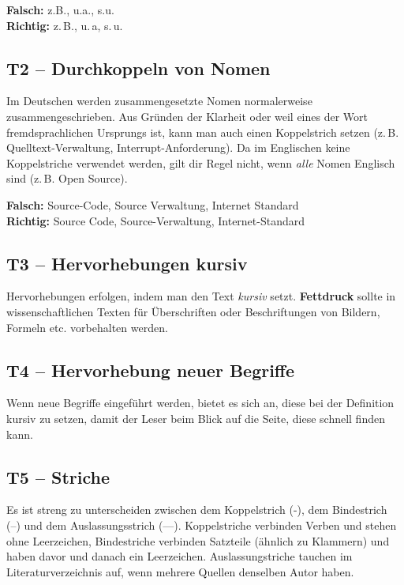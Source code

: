 \documentclass[a4paper,11pt,headings=normal]{scrartcl}
\begin{document}
\textbf{Falsch:} z.B., u.a., s.u. \\
\textbf{Richtig:} z.\,B., u.\,a, s.\,u.


\subsection*{T2 -- Durchkoppeln von Nomen}

Im Deutschen werden zusammengesetzte Nomen normalerweise zusammengeschrieben. Aus Gründen der Klarheit oder weil eines der Wort fremdsprachlichen Ursprungs ist, kann man auch einen Koppelstrich setzen (z.\,B. Quelltext-Verwaltung, Interrupt-Anforderung). Da im Englischen keine Koppelstriche verwendet werden, gilt dir Regel nicht, wenn \textit{alle} Nomen Englisch sind (z.\,B. Open Source).

\textbf{Falsch:} Source-Code, Source Verwaltung, Internet Standard \\
\textbf{Richtig:} Source Code, Source-Verwaltung, Internet-Standard


\subsection*{T3 -- Hervorhebungen kursiv}

Hervorhebungen erfolgen, indem man den Text \textit{kursiv} setzt. \textbf{Fettdruck} sollte in wissenschaftlichen Texten für Überschriften oder Beschriftungen von Bildern, Formeln etc. vorbehalten werden.


\subsection*{T4 -- Hervorhebung neuer Begriffe}

Wenn neue Begriffe eingeführt werden, bietet es sich an, diese bei der Definition kursiv zu setzen, damit der Leser beim Blick auf die Seite, diese schnell finden kann.


\subsection*{T5 -- Striche}

Es ist streng zu unterscheiden zwischen dem Koppelstrich (-), dem Bindestrich (--) und dem Auslassungsstrich (---). Koppelstriche verbinden Verben und stehen ohne Leerzeichen, Bindestriche verbinden Satzteile (ähnlich zu Klammern) und haben davor und danach ein Leerzeichen. Auslassungstriche tauchen im Literaturverzeichnis auf, wenn mehrere Quellen denselben Autor haben.
\end{document}
